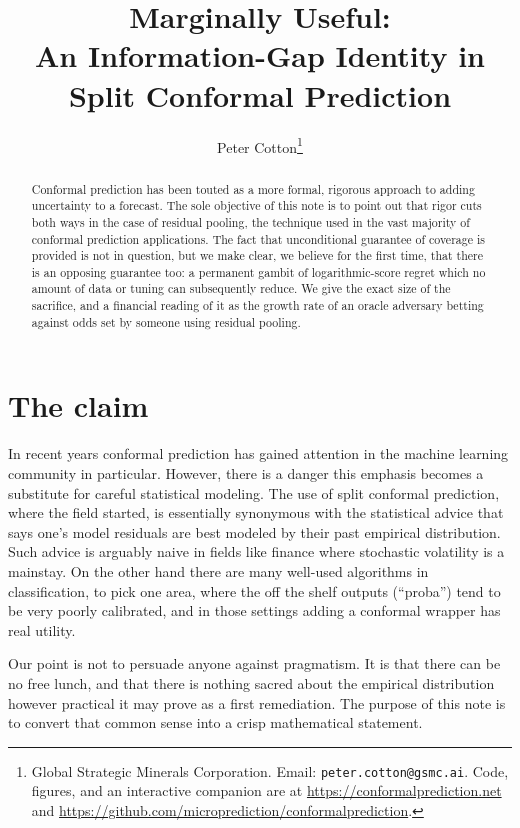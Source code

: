 \documentclass[11pt]{article}
\title{Marginally Useful:\\ An Information-Gap Identity in Split Conformal Prediction}
\author{Peter Cotton\thanks{Global Strategic Minerals Corporation.
  Email: \texttt{peter.cotton@gsmc.ai}. Code, figures, and an interactive companion are at
  \url{https://conformalprediction.net} and
  \url{https://github.com/microprediction/conformalprediction}.}}
\date{}
\theoremstyle{definition}
\begin{document}
\maketitle

\begin{abstract}
\noindent
Conformal prediction has been touted as a more formal, rigorous approach to adding
uncertainty to a forecast. The sole objective of this note is to point out that rigor cuts
both ways in the case of residual pooling, the technique used in the vast majority of
conformal prediction applications. The fact that unconditional guarantee of coverage is
provided is not in question, but we make clear, we believe for the first time, that there is
an opposing guarantee too: a permanent gambit of logarithmic-score regret which no amount of
data or tuning can subsequently reduce. We give the exact size of the sacrifice, and a
financial reading of it as the growth rate of an oracle adversary betting against odds set
by someone using residual pooling.
\end{abstract}

\section{The claim}

In recent years conformal prediction has gained attention in the machine learning community
in particular. However, there is a danger this emphasis becomes a substitute for careful
statistical modeling. The use of split conformal prediction, where the field started, is
essentially synonymous with the statistical advice that says one's model residuals are best
modeled by their past empirical distribution. Such advice is arguably naive in fields like
finance where stochastic volatility is a mainstay. On the other hand there are many
well-used algorithms in classification, to pick one area, where the off the shelf outputs
(``proba'') tend to be very poorly calibrated, and in those settings adding a conformal
wrapper has real utility.

Our point is not to persuade anyone against pragmatism. It is that there can be no free
lunch, and that there is nothing sacred about the empirical distribution however practical
it may prove as a first remediation. The purpose of this note is to convert that common
sense into a crisp mathematical statement.
\end{document}
